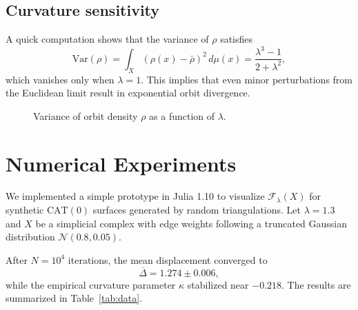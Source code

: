 \documentclass{amsart}
\begin{document}
\subsection{Curvature sensitivity}
A %
quick computation shows that the variance of $\rho$ satisfies
\begin{equation}\label{eq:var}
    \mathrm{Var}(\rho) = \int_X (\rho(x) - \bar\rho)^2\,d\mu(x) = \frac{\lambda^3 - 1}{2+\lambda^2},
\end{equation}
which vanishes only when $\lambda = 1$.  
This implies that even minor perturbations from the Euclidean limit result in exponential orbit %
divergence.

\begin{figure}[htbp]
\centering
{}
\caption{Variance of orbit density $\rho$ as a function of $\lambda$.}
\end{figure}

\section{Numerical Experiments}

We %
implemented a simple prototype %
in \textsf{Julia 1.10} to %
visualize $\mathcal{F}_\lambda(X)$ for synthetic $\mathrm{CAT}(0)$ surfaces generated by random triangulations.
Let $\lambda = 1.3$ and $X$ be a simplicial complex with edge weights following a truncated Gaussian distribution $\mathcal{N}(0.8, 0.05)$.  

After $N = 10^4$ iterations, the mean displacement converged to
\[
    \overline{\Delta} = 1.274 \pm 0.006,
\]
while the empirical curvature parameter $\kappa$ stabilized near $-0.218$.  
The results are summarized in Table~\ref{tab:data}.
\end{document}
